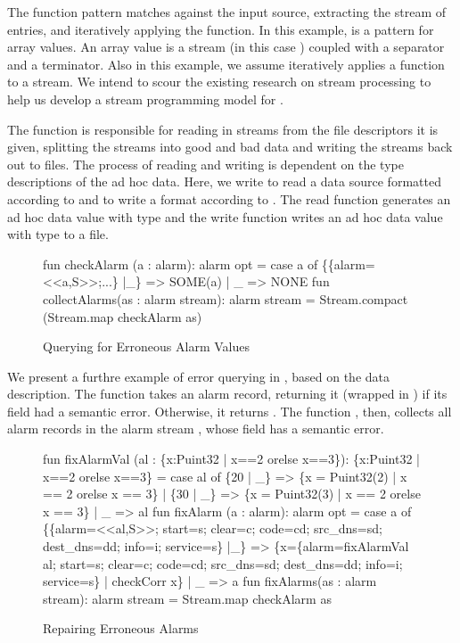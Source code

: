 \documentclass{entcs}
\begin{document}
The  function pattern matches against the input
source, extracting the stream of entries, and iteratively applying the
 function.  In this example, 
is a pattern for array values.  An array value is a stream (in this
case ) coupled with a separator and a terminator.  Also in
this example, we assume  iteratively applies a
function to a stream.  We intend to scour the existing research on
stream processing to help us develop a stream programming model for
\datatype.

The function  is responsible for reading in streams from the
file descriptors it is given, splitting the streams into good and bad
data and writing the streams back out to files.  The process of
reading and writing is dependent on the type descriptions of the ad
hoc data.  Here, we write  to read a data source formatted
according to  and  to write a format according to
.  The read function generates an ad hoc data value with type
 and the write function writes an ad hoc data value with type
 to a file.

\begin{figure}
  \centering
\begin{code}
fun checkAlarm (a : alarm): alarm opt =
    case a of 
	\{\{alarm=<<a,S>>;...\} |_\} => SOME(a)
      | _ => NONE
\mbox{}
fun collectAlarms(as : alarm stream): alarm stream =
    Stream.compact (Stream.map checkAlarm as)  
\end{code}
  \caption{Querying for Erroneous Alarm Values}
  \label{fig:ex-error-query}
\end{figure}

We present a furthre example of error querying in
, based on the \darkstar{} data
description. The function  takes an alarm record,
returning it (wrapped in ) if its  field had a
semantic error. Otherwise, it returns . The function
, then, collects all alarm records in the alarm
stream , whose  field has a semantic error.

\begin{figure}
  \centering
\begin{code}
fun fixAlarmVal (al : \{x:Puint32 | x==2 orelse x==3\}): 
  \{x:Puint32 | x==2 orelse x==3\} =
    case al of
      \{20 | _\} => \{x = Puint32(2) | x == 2 orelse x == 3\}
    | \{30 | _\} => \{x = Puint32(3) | x == 2 orelse x == 3\}
    | _ => al
\mbox{}
fun fixAlarm (a : alarm): alarm opt =
    case a of 
	\{\{alarm=<<al,S>>; start=s; clear=c; 
          code=cd; src_dns=sd; dest_dns=dd; 
	  info=i; service=s\} |_\} 
          => \{x=\{alarm=fixAlarmVal al; 
                 start=s; clear=c; 
                 code=cd; src_dns=sd; dest_dns=dd; 
                 info=i; service=s\}
              | checkCorr x\} 
      | _ => a
\mbox{}
fun fixAlarms(as : alarm stream): alarm stream =
    Stream.map checkAlarm as
\end{code}
  \caption{Repairing Erroneous Alarms}
  \label{fig:ex-error-repair}
\end{figure}
\end{document}
